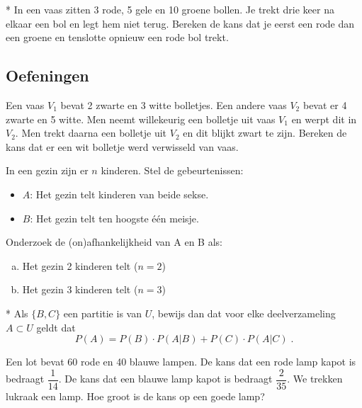 \documentclass[12pt,twoside]{article}
\begin{document}
\begin{oefening}*
In een vaas zitten 3 rode, 5 gele en 10 groene bollen. Je trekt drie keer na elkaar een bol en legt hem niet terug. Bereken de kans dat je eerst een rode dan een groene en tenslotte opnieuw een rode bol trekt.
\end{oefening}

\subsection{Oefeningen}

\begin{oefening}
Een vaas $V_1$ bevat 2 zwarte en 3 witte bolletjes. Een andere vaas $V_2$ bevat er 4 zwarte
en 5 witte. Men neemt willekeurig een bolletje uit vaas $V_1$ en werpt dit in $V_2$. Men
trekt daarna een bolletje uit $V_2$ en dit blijkt zwart te zijn. Bereken de kans dat er een
wit bolletje werd verwisseld van vaas.
\end{oefening}

\begin{oefening}
In een gezin zijn er $n$ kinderen. Stel de gebeurtenissen:
\begin{itemize}
  \item $A$: Het gezin telt kinderen van beide sekse.
  \item $B$: Het gezin telt ten hoogste één meisje.
\end{itemize}
	Onderzoek de (on)afhankelijkheid van A en B als:
\begin{enumerate}[(a)]
  \item Het gezin 2 kinderen telt ($n = 2$)
  \item Het gezin 3 kinderen telt ($n = 3$)
\end{enumerate}
\end{oefening}

\begin{oefening}*
Als $\{B,C\}$ een partitie is van $U$, bewijs dan dat voor elke deelverzameling $A\subset U$ geldt dat
$$P(A)=P(B)\cdot P(A|B)+P(C)\cdot P(A|C)\;.$$
\end{oefening}

\begin{oefening}
Een lot bevat 60 rode en 40 blauwe lampen. De kans dat een rode lamp kapot is bedraagt $\dfrac{1}{14}$. De kans dat een blauwe lamp kapot is bedraagt $\dfrac{2}{35}$. We trekken lukraak een lamp. Hoe groot is de kans op een goede lamp?
\end{oefening}

\newpage
\appendix
\end{document}
